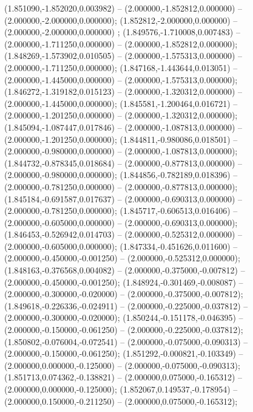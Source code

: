 (1.851090,-1.852020,0.003982) -- (2.000000,-1.852812,0.000000) -- (2.000000,-2.000000,0.000000);
 (1.852812,-2.000000,0.000000) -- (2.000000,-2.000000,0.000000) ;
 (1.849576,-1.710008,0.007483) -- (2.000000,-1.711250,0.000000) -- (2.000000,-1.852812,0.000000);
 (1.848269,-1.573902,0.010505) -- (2.000000,-1.575313,0.000000) -- (2.000000,-1.711250,0.000000);
 (1.847168,-1.443644,0.013051) -- (2.000000,-1.445000,0.000000) -- (2.000000,-1.575313,0.000000);
 (1.846272,-1.319182,0.015123) -- (2.000000,-1.320312,0.000000) -- (2.000000,-1.445000,0.000000);
 (1.845581,-1.200464,0.016721) -- (2.000000,-1.201250,0.000000) -- (2.000000,-1.320312,0.000000);
 (1.845094,-1.087447,0.017846) -- (2.000000,-1.087813,0.000000) -- (2.000000,-1.201250,0.000000);
 (1.844811,-0.980086,0.018501) -- (2.000000,-0.980000,0.000000) -- (2.000000,-1.087813,0.000000);
 (1.844732,-0.878345,0.018684) -- (2.000000,-0.877813,0.000000) -- (2.000000,-0.980000,0.000000);
 (1.844856,-0.782189,0.018396) -- (2.000000,-0.781250,0.000000) -- (2.000000,-0.877813,0.000000);
 (1.845184,-0.691587,0.017637) -- (2.000000,-0.690313,0.000000) -- (2.000000,-0.781250,0.000000);
 (1.845717,-0.606513,0.016406) -- (2.000000,-0.605000,0.000000) -- (2.000000,-0.690313,0.000000);
 (1.846453,-0.526942,0.014703) -- (2.000000,-0.525312,0.000000) -- (2.000000,-0.605000,0.000000);
 (1.847334,-0.451626,0.011600) -- (2.000000,-0.450000,-0.001250) -- (2.000000,-0.525312,0.000000);
 (1.848163,-0.376568,0.004082) -- (2.000000,-0.375000,-0.007812) -- (2.000000,-0.450000,-0.001250);
 (1.848924,-0.301469,-0.008087) -- (2.000000,-0.300000,-0.020000) -- (2.000000,-0.375000,-0.007812);
 (1.849618,-0.226336,-0.024911) -- (2.000000,-0.225000,-0.037812) -- (2.000000,-0.300000,-0.020000);
 (1.850244,-0.151178,-0.046395) -- (2.000000,-0.150000,-0.061250) -- (2.000000,-0.225000,-0.037812);
 (1.850802,-0.076004,-0.072541) -- (2.000000,-0.075000,-0.090313) -- (2.000000,-0.150000,-0.061250);
 (1.851292,-0.000821,-0.103349) -- (2.000000,0.000000,-0.125000) -- (2.000000,-0.075000,-0.090313);
 (1.851713,0.074362,-0.138821) -- (2.000000,0.075000,-0.165312) -- (2.000000,0.000000,-0.125000);
 (1.852067,0.149537,-0.178954) -- (2.000000,0.150000,-0.211250) -- (2.000000,0.075000,-0.165312);
